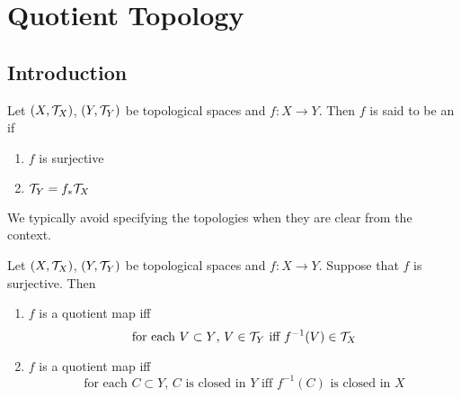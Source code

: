\documentclass{book}
\begin{document}
	
	
	
	
	
	
	
	
	
	
	
	
	
	
	
	
	
	
	\newpage
	\section{Quotient Topology}
	
	\subsection{Introduction}
	
	\begin{defn} 
	Let $(X, \mathcal{T}_X)$, $(Y, \mathcal{T}_Y)$ be topological spaces and $f:X \rightarrow Y$. Then $f$ is said to be an  if 
	\begin{enumerate}
	\item $f$ is surjective
	\item $\mathcal{T}_Y = f_*\mathcal{T}_X$
	\end{enumerate}
	\end{defn}
	
	\begin{note}
	We typically avoid specifying the topologies when they are clear from the context.
	\end{note}

	\begin{ex} 
		Let $(X, \mathcal{T}_X)$, $(Y, \mathcal{T}_Y)$ be topological spaces and $f:X \rightarrow Y$. Suppose that $f$ is surjective. Then 
		\begin{enumerate}
			\item $f$ is a quotient map iff 
			$$ \text{for each $V \subset Y$, $V \in \mathcal{T}_Y$ iff $f^{-1}(V) \in \mathcal{T}_X$} $$
			\item $f$ is a quotient map iff 
			$$ \text{for each $C \subset Y$, $C$ is closed in $Y$ iff $f^{-1}(C)$ is closed in $X$} $$
		\end{enumerate}
	\end{ex}
	
\end{document}
